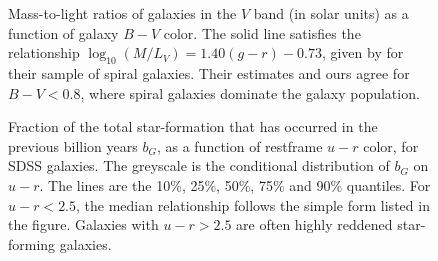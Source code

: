 \clearpage
{}
\begin{figure}
\figurenum{\fignum}
\caption{\label{mtol} Mass-to-light ratios of galaxies in the $V$ band
	(in solar units) as a function of galaxy $B-V$ color. The solid line
	satisfies the relationship $\log_{10}(M/L_V) = 1.40 (g-r) - 0.73$,
	given by \citet{bell01b} for their sample of spiral galaxies. 
	Their estimates and ours agree for $B-V < 0.8$, where spiral
	galaxies dominate the galaxy population.}
\end{figure}

\clearpage
{}
\begin{figure}
\figurenum{\fignum}
\caption{\label{umr_bg} Fraction of the total star-formation that has
	occurred in the previous billion years $b_G$, as a function of restframe
	$u-r$ color, for SDSS galaxies. The greyscale is the conditional
	distribution of $b_G$ on $u-r$. The lines are the 10\%, 25\%, 50\%,
	75\% and 90\% quantiles. For $u-r < 2.5$, the median relationship
	follows the simple form listed in the figure. Galaxies with $u-r >
	2.5$ are often highly reddened star-forming galaxies.}
\end{figure}
